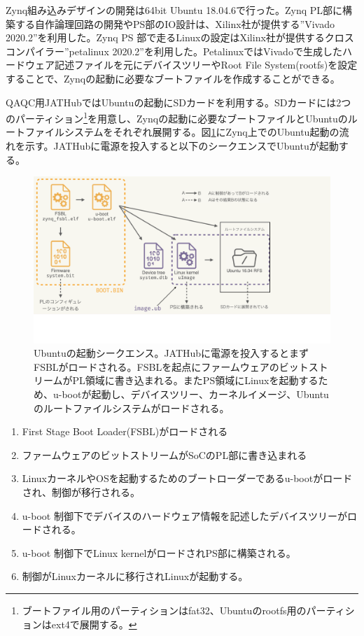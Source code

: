 Zynq組み込みデザインの開発は64bit Ubuntu 18.04.6で行った。Zynq PL部に構築する自作論理回路の開発やPS部のIO設計は、Xilinx社が提供する”Vivado 2020.2”を利用した。Zynq PS 部で走るLinuxの設定はXilinx社が提供するクロスコンパイラー”petalinux 2020.2”を利用した。PetalinuxではVivadoで生成したハードウェア記述ファイルを元にデバイスツリーやRoot File System(rootfs)を設定することで、Zynqの起動に必要なブートファイルを作成することができる。\par
QAQC用JATHubではUbuntuの起動にSDカードを利用する。SDカードには2つのパーティション\footnote{ブートファイル用のパーティションはfat32、Ubuntuのrootfs用のパーティションはext4で展開する。}を用意し、Zynqの起動に必要なブートファイルとUbuntuのルートファイルシステムをそれぞれ展開する。図\ref{JATHubboot}にZynq上でのUbuntu起動の流れを示す\cite{mt_okazaki}。JATHubに電源を投入すると以下のシークエンスでUbuntuが起動する。

\begin{figure} 
\centering
\includegraphics[width=12cm]{fig/QAQC/JATHubboot.pdf}
\caption[Ubuntuの起動シークエンス]{Ubuntuの起動シークエンス。JATHubに電源を投入するとまずFSBLがロードされる。FSBLを起点にファームウェアのビットストリームがPL領域に書き込まれる。またPS領域にLinuxを起動するため、u-bootが起動し、デバイスツリー、カーネルイメージ、Ubuntuのルートファイルシステムがロードされる。}
\label{JATHubboot}
\end{figure}

\begin{enumerate}
    \item First Stage Boot Loader(FSBL)がロードされる
    \item ファームウェアのビットストリームがSoCのPL部に書き込まれる
    \item LinuxカーネルやOSを起動するためのブートローダーであるu-bootがロードされ、制御が移行される。
    \item u-boot 制御下でデバイスのハードウェア情報を記述したデバイスツリーがロードされる。
    \item u-boot 制御下でLinux kernelがロードされPS部に構築される。
    \item 制御がLinuxカーネルに移行されLinuxが起動する。
\end{enumerate}

